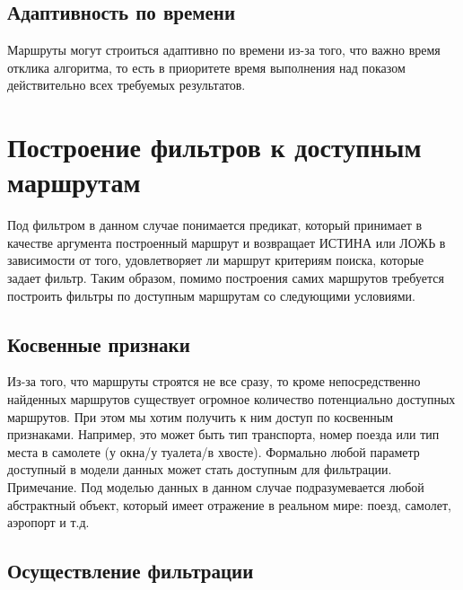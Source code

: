 \subsection{Адаптивность по времени}
Маршруты могут строиться адаптивно по времени из-за того, что важно время отклика алгоритма, то есть в приоритете время выполнения над показом действительно всех требуемых результатов.

\section{Построение фильтров к доступным маршрутам}
Под фильтром в данном случае понимается предикат, который принимает в качестве аргумента построенный маршрут и возвращает ИСТИНА или ЛОЖЬ в зависимости от того, удовлетворяет ли маршрут критериям поиска, которые задает фильтр.
Таким образом, помимо построения самих маршрутов требуется построить фильтры по доступным маршрутам со следующими условиями.

\subsection{Косвенные признаки}
Из-за того, что маршруты строятся не все сразу, то кроме непосредственно найденных маршрутов существует огромное количество потенциально доступных маршрутов. При этом мы хотим получить к ним доступ по косвенным признаками. Например, это может быть тип транспорта, номер поезда или тип места в самолете (у окна/у туалета/в хвосте). Формально любой параметр доступный в модели данных может стать доступным для фильтрации.
Примечание. Под моделью данных в данном случае подразумевается любой абстрактный объект, который имеет отражение в реальном мире: поезд, самолет, аэропорт и т.д.

\subsection{Осуществление фильтрации}


